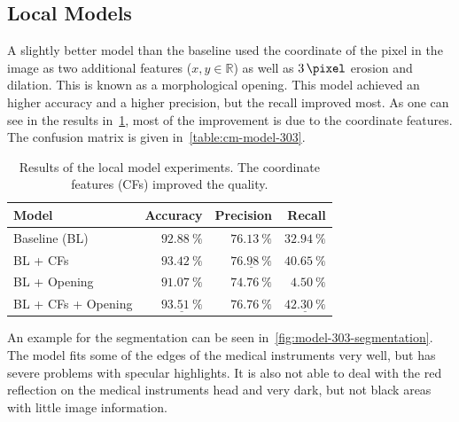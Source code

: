 
\subsection{Local Models}\label{sec:ap4}

A slightly better model than the baseline used the coordinate of the pixel in
the image as two additional features ($x, y \in \mathbb{R}$) as well as
$\SI{3}{\pixel}$ erosion and dilation. This is known as a morphological
opening. This model achieved an higher accuracy and a higher precision, but the
recall improved most. As one can see in the results
in~\cref{table:results-local-model-experiments}, most of the improvement is due
to the coordinate features. The confusion matrix is given
in~\cref{table:cm-model-303}.

\begin{table}[ht]
    \centering
    \begin{tabular}{lrrr}
    \toprule
    Model              & Accuracy & Precision & Recall \\\midrule
    Baseline (BL)      & $\SI{92.88}{\percent}$  & $\SI{76.13}{\percent}$ & $\SI{32.94}{\percent}$\\
    BL + CFs           & $\SI{93.42}{\percent}$  & $\underline{\SI{76.98}{\percent}}$ & $\SI{40.65}{\percent}$\\
    BL + Opening       & $\SI{91.07}{\percent}$  & $\SI{74.76}{\percent}$ & $\SI{4.50 }{\percent}$\\
    BL + CFs + Opening & $\underline{\SI{93.51}{\percent}}$  & $\SI{76.76}{\percent}$ & $\underline{\SI{42.30}{\percent}}$\\
    \bottomrule
    \end{tabular}
    \caption{Results of the local model experiments. The coordinate features (CFs)
             improved the quality.}
    \label{table:results-local-model-experiments}
\end{table}

An example for the segmentation can be seen
in~\cref{fig:model-303-segmentation}. The model fits some of the edges of the
medical instruments very well, but has severe problems with specular
highlights. It is also not able to deal with the red reflection on the medical
instruments head and very dark, but not black areas with little image
information.

